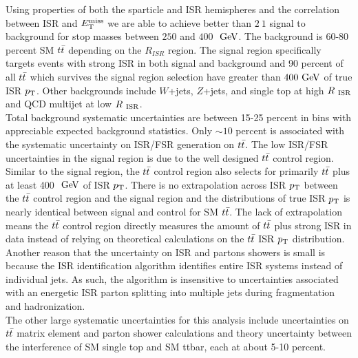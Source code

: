 
\indent Using properties of both the sparticle and ISR hemispheres and the correlation between ISR and $E_{\mathrm{T}}^{\mathrm{miss}}$ we are able to achieve better than $2\:1$ signal to background for stop masses between $250$ and $400$ $\gev$.  The background is 60-80 percent SM $t\bar{t}$ depending on the $R_{ISR}$ region.  The signal region specifically targets events with strong ISR in both signal and background and 90 percent of all $t\bar{t}$ which survives the signal region selection have greater than $ 400 \gev$ of true ISR $p_{\mathrm{T}}$. Other backgrounds include $W$+jets, $Z$+jets, and single top at high $R_{~\mathrm{ISR}}$ and QCD multijet at low $R_{~\mathrm{ISR}}$. \\

\indent Total background systematic uncertainties are between 15-25 percent in bins with appreciable expected background statistics.  Only $\sim10$ percent is associated with the systematic uncertainty on ISR/FSR generation on $t\bar{t}$.  The low ISR/FSR uncertainties in the signal region is due to the well designed $t\bar{t}$ control region.  \\

\indent Similar to the signal region, the $t\bar{t}$ control region also selects for primarily $t\bar{t}$ plus at least 400 $\gev$ of ISR $p_{\mathrm{T}}$.  There is no extrapolation across ISR $p_{\mathrm{T}}$ between the $t\bar{t}$ control region and the signal region and the distributions of true ISR $p_{\mathrm{T}}$ is nearly identical between signal and control for SM $t\bar{t}$.  The lack of extrapolation means the $t\bar{t}$ control region directly measures the amount of $t\bar{t}$ plus strong ISR in data instead of relying on theoretical calculations on the $t\bar{t}$ ISR $p_{\mathrm{T}}$ distribution.  \\

\indent Another reason that the uncertainty on ISR and partons showers is small is because the ISR identification algorithm identifies entire ISR systems instead of individual jets.  As such, the algorithm is insensitive to uncertainties associated with an energetic ISR parton splitting into multiple jets during fragmentation and hadronization. \\

\indent The other large systematic uncertainties for this analysis include uncertainties on $t\bar{t}$ matrix element and parton shower calculations and theory uncertainty between the interference of SM single top and SM ttbar, each at about 5-10 percent.    \\

